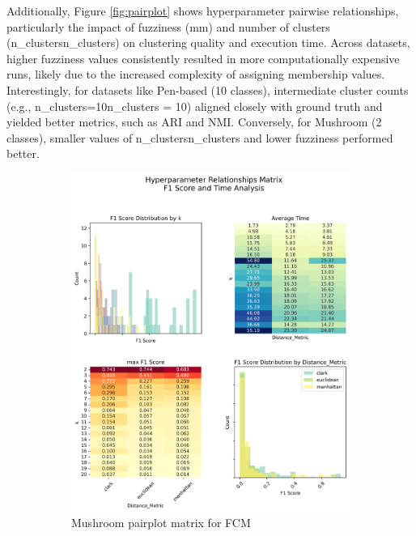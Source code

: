 Additionally, Figure \ref{fig:pairplot} shows hyperparameter pairwise relationships, particularly the impact of fuzziness (mm) and number of clusters (n_clustersn\_clusters) on clustering quality and execution time. Across datasets, higher fuzziness values consistently resulted in more computationally expensive runs, likely due to the increased complexity of assigning membership values. Interestingly, for datasets like Pen-based (10 classes), intermediate cluster counts (e.g., n_clusters=10n\_clusters = 10) aligned closely with ground truth and yielded better metrics, such as ARI and NMI. Conversely, for Mushroom (2 classes), smaller values of n_clustersn\_clusters and lower fuzziness performed better.


\begin{figure}[H]
\centering
\begin{subfigure}{0.49\textwidth}
\centering
\includegraphics[width=\linewidth]{figures/mushroom_hyperparameter_pairplot_matrix.png}
\caption{Mushroom pairplot matrix for FCM}
\end{subfigure}
\hfill
\begin{subfigure}{0.49\textwidth}

\end{subfigure}
\end{figure}
